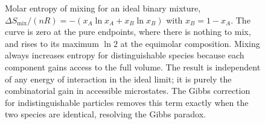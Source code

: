 \begin{figure}[htbp]
\centering
{}
\caption[Entropy of mixing for a binary ideal mixture]{Molar entropy of mixing
for an ideal binary mixture,
$\Delta S_{\mathrm{mix}}/(nR)=-(x_A\ln x_A+x_B\ln x_B)$ with $x_B=1-x_A$. The
curve is zero at the pure endpoints, where there is nothing to mix, and rises
to its maximum $\ln 2$ at the equimolar composition. Mixing always increases
entropy for distinguishable species because each component gains access to the
full volume. The result is independent of any energy of interaction in the
ideal limit; it is purely the combinatorial gain in accessible microstates.
The Gibbs correction for indistinguishable particles removes this term exactly
when the two species are identical, resolving the Gibbs paradox.}
\label{fig:vol04ch04:entropy-of-mixing}
\end{figure}

